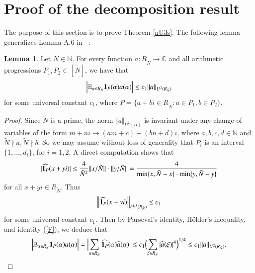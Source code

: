 \documentclass[12pt,amstex]{amsart}
\theoremstyle{definition}
\newtheorem{lem}[thm]{Lemma}
\def \A {\alpha}
\def \R {R_{\tilde{N}}}
\begin{document}
\section{Proof of the decomposition result} The purpose of this section is to prove Theorem \ref{nU3s}.
The following lemma generalizes Lemma A.6 in ~\cite{FH}:

\begin{lem}\label{1p}
  Let $N\in\mathbb{N}$. For every function $a\colon \R\rightarrow\mathbb{C}$ and all arithmetic progressions $P_{1}, P_{2}\subset[\tilde{N}]$, we have that
  \begin{equation}\nonumber
    \begin{split}
      \Bigl\vert\mathbb{E}_{\A\in \R}\bold{1}_{P}(\A)a(\A)\Bigr\vert\leq c_{1}\Vert a\Vert_{U^{2}(\R)}
    \end{split}
  \end{equation}
  for some universal constant $c_{1}$, where $P=\{a+bi\in \R\colon a\in P_{1}, b\in P_{2}\}$.
\end{lem}
\begin{proof}
  Since $\tilde{N}$ is a prime, the norm $\Vert a\Vert_{U^{2}(\A)}$ is invariant under any change of variables of the form $m+ni\rightarrow (am+c)+(bn+d)i$, where $a,b,c,d\in\mathbb{N}$ and $\tilde{N}\nmid a, \tilde{N}\nmid b$. So we may assume without loss of generality that $P_{i}$ is an interval $\{1,\dots,d_{i}\}$, for $i=1,2$. A direct computation shows that
    \begin{equation}\nonumber
    \begin{split}
     \vert\widehat{\bold{1}_{P}}(x+yi)\vert\leq\frac{4}{\tilde{N}^{2}}\Vert x/\tilde{N}\Vert\cdot\Vert y/\tilde{N}\Vert=\frac{4}{\min\{x,\tilde{N}-x\}\cdot\min\{y,\tilde{N}-y\}}
    \end{split}
  \end{equation}
  for all $x+yi\in \R$. Thus
      \begin{equation}\nonumber
    \begin{split}
     \Bigl\Vert\widehat{\bold{1}_{P}}(x+yi)\Bigr\Vert_{\ell^{4/3}(\R)}\leq c_{1}
    \end{split}
  \end{equation}
  for some universal constant $c_{1}$. Then by Parseval's identity, H\"{o}lder's inequality, and identity (\ref{F}), we deduce that
    \begin{equation}\nonumber
    \begin{split}
      \Bigl\vert\mathbb{E}_{\A\in \R}\bold{1}_{P}(\A)a(\A)\Bigr\vert
      =\Bigl\vert\sum_{\A\in \R}\widehat{\bold{1}_{P}}(\A)\widehat{a}(\A)\Bigr\vert
      \leq c_{1}\Bigl(\sum_{\xi\in \R}\vert \widehat{a}(\xi)\vert^{4}\Bigr)^{1/4}
      \leq c_{1}\Vert a\Vert_{U^{2}(\R)}.
    \end{split}
  \end{equation}
\end{proof}
\end{document}

